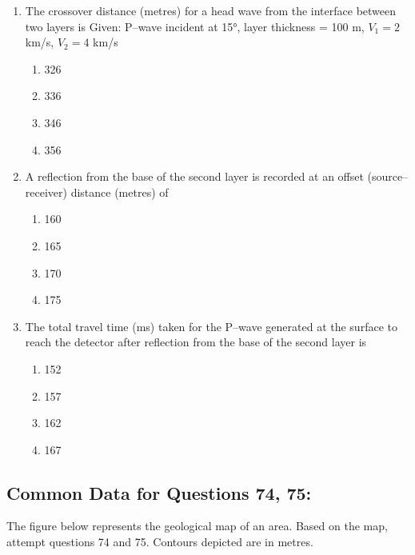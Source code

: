 \documentclass[journal,12pt,onecolumn]{IEEEtran}
\theoremstyle{remark}
\begin{document}
\begin{enumerate}[resume]
\item The crossover distance (metres) for a head wave from the interface between two layers is  
Given: P--wave incident at 15°, layer thickness = 100 m, $V_1 = 2$ km/s, $V_2 = 4$ km/s

\begin{multicols}{4}
\begin{enumerate}
\item 326  
\item 336  
\item 346  
\item 356  
\end{enumerate}
\end{multicols}
\vspace{0.5cm}

\item A reflection from the base of the second layer is recorded at an offset (source--receiver) distance (metres) of

\begin{multicols}{4}
\begin{enumerate}
\item 160  
\item 165  
\item 170  
\item 175  
\end{enumerate}
\end{multicols}
\vspace{0.5cm}

\item The total travel time (ms) taken for the P--wave generated at the surface to reach the detector after reflection from the base of the second layer is

\begin{multicols}{4}
\begin{enumerate}
\item 152  
\item 157  
\item 162  
\item 167  
\end{enumerate}
\end{multicols}
\vspace{0.5cm}

\end{enumerate}





\subsection*{Common Data for Questions 74, 75:}
The figure below represents the geological map of an area. Based on the map, attempt questions 74 and 75. Contours depicted are in metres.
\end{document}
